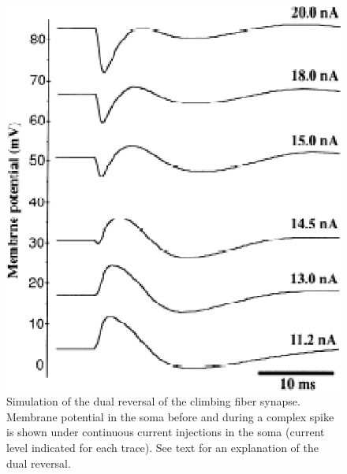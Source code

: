 \documentclass[12pt]{article}
\begin{document}
\clearpage

\begin{figure}[h]
\centering
   \includegraphics[scale=0.75]{figures/Fig.2.2.eps}
   \caption{Simulation of the dual reversal of the climbing fiber synapse. Membrane potential in the soma before and during a complex spike is shown under continuous current injections in the soma (current level indicated for each trace). See text for an explanation of the dual reversal.}
   \label{fig:DS2.2}
\end{figure}

\clearpage
\end{document}
